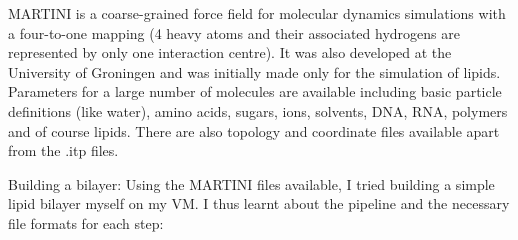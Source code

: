 \documentclass[12pt, a4paper]{report}
\begin{document}
MARTINI is a coarse-grained force field for molecular dynamics simulations with a four-to-one mapping (4 heavy atoms and their associated hydrogens are represented by only one interaction centre). It was also developed at the University of Groningen and was initially made only for the simulation of lipids. Parameters for a large number of molecules are available including basic particle definitions (like water), amino acids, sugars, ions, solvents, DNA, RNA, polymers and of course lipids. There are also topology and coordinate files available apart from the .itp files. 

Building a bilayer: Using the MARTINI files available, I tried building a simple lipid bilayer myself on my VM. I thus learnt about the pipeline and the necessary file formats for each step: 
\\~\\ 
\end{document}
